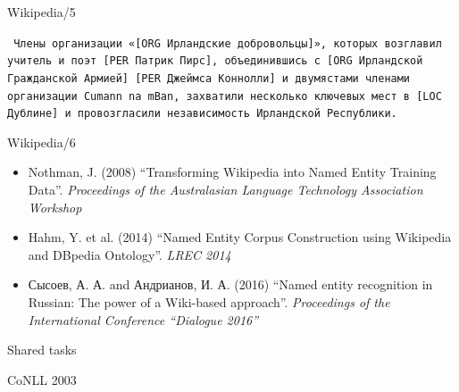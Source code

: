 \documentclass[10pt, compress]{beamer}
\begin{document}
\begin{frame}{Wikipedia/5}

{\tt
Члены организации «[{\sc ORG} Ирландские добровольцы]», которых возглавил 
учитель и поэт [{\sc PER} Патрик Пирс], объединившись с [{\sc ORG} Ирландской 
Гражданской Армией] [{\sc PER} Джеймса Коннолли] и двумястами членами 
организации \alert<2>{Cumann na mBan}, захватили несколько ключевых мест 
в [{\sc LOC} Дублине] и провозгласили независимость \alert<2>{Ирландской Республики}.
}

\end{frame}

\begin{frame}{Wikipedia/6}

\begin{itemize}
  \item Nothman, J. (2008) ``Transforming Wikipedia into Named Entity Training Data''. \emph{Proceedings of the Australasian Language Technology Association Workshop}
  \item Hahm, Y. et al. (2014) ``Named Entity Corpus Construction using Wikipedia and DBpedia Ontology''. \emph{LREC 2014}
  \item Сысоев, А. А. and Андрианов, И. А. (2016) ``Named entity recognition in Russian: The power of a Wiki-based approach''. \emph{Proceedings of the International Conference “Dialogue 2016”}
\end{itemize}

\end{frame}



\begin{frame}[standout]
Shared tasks
\end{frame}

\begin{frame}{CoNLL 2003}



\end{frame}
\end{document}
